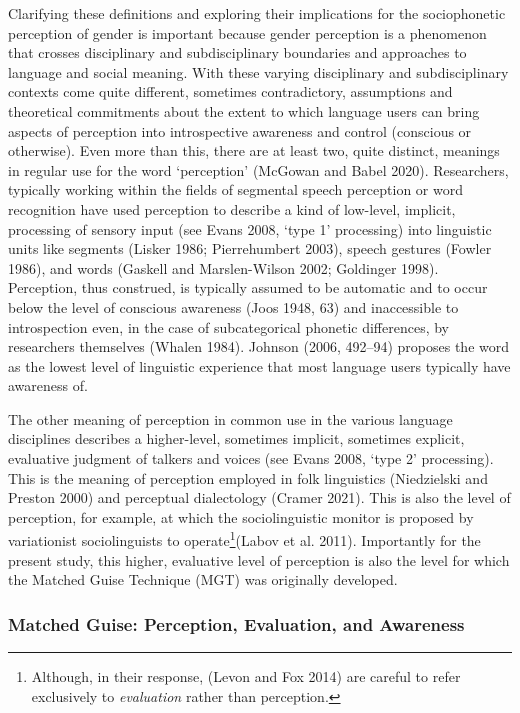 \documentclass[
  letterpaper,
  DIV=11,
  numbers=noendperiod]{scrartcl}
\begin{document}
Clarifying these definitions and exploring their implications for the
sociophonetic perception of gender is important because gender
perception is a phenomenon that crosses disciplinary and subdisciplinary
boundaries and approaches to language and social meaning. With these
varying disciplinary and subdisciplinary contexts come quite different,
sometimes contradictory, assumptions and theoretical commitments about
the extent to which language users can bring aspects of perception into
introspective awareness and control (conscious or otherwise). Even more
than this, there are at least two, quite distinct, meanings in regular
use for the word `perception' (McGowan and Babel 2020). Researchers,
typically working within the fields of segmental speech perception or
word recognition have used perception to describe a kind of low-level,
implicit, processing of sensory input (see Evans 2008, `type 1'
processing) into linguistic units like segments (Lisker 1986;
Pierrehumbert 2003), speech gestures (Fowler 1986), and words (Gaskell
and Marslen-Wilson 2002; Goldinger 1998). Perception, thus construed, is
typically assumed to be automatic and to occur below the level of
conscious awareness (Joos 1948, 63) and inaccessible to introspection
even, in the case of subcategorical phonetic differences, by researchers
themselves (Whalen 1984). Johnson (2006, 492--94) proposes the word as
the lowest level of linguistic experience that most language users
typically have awareness of.

The other meaning of perception in common use in the various language
disciplines describes a higher-level, sometimes implicit, sometimes
explicit, evaluative judgment of talkers and voices (see Evans 2008,
`type 2' processing). This is the meaning of perception employed in folk
linguistics (Niedzielski and Preston 2000) and perceptual dialectology
(Cramer 2021). This is also the level of perception, for example, at
which the sociolinguistic monitor is proposed by variationist
sociolinguists to operate\footnote{Although, in their response, (Levon
  and Fox 2014) are careful to refer exclusively to \emph{evaluation}
  rather than perception.}(Labov et al. 2011). Importantly for the
present study, this higher, evaluative level of perception is also the
level for which the Matched Guise Technique (MGT) was originally
developed.

\subsubsection{Matched Guise: Perception, Evaluation, and
Awareness}\label{sub-mgt}
\end{document}
